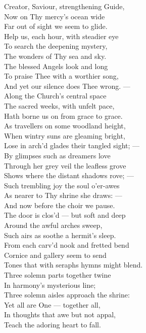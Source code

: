 Creator, Saviour, strengthening Guide, \\
 Now on Thy mercy’s ocean wide \\
 Far out of sight we seem to glide. \\
  Help us, each hour, with steadier eye \\
 To search the deepening mystery, \\
 The wonders of Thy sea and sky. \\
  The blessed Angels look and long \\
 To praise Thee with a worthier song, \\
 And yet our silence does Thee wrong. — \\
  Along the Church’s central space \\
 The sacred weeks, with unfelt pace, \\
 Hath borne us on from grace to grace. \\
  As travellers on some woodland height, \\
 When wintry suns are gleaming bright, \\
 Lose in arch’d glades their tangled sight; — \\
  By glimpses such as dreamers love \\
 Through her grey veil the leafless grove \\
 Shows where the distant shadows rove; — \\
  Such trembling joy the soul o’er-awes \\
 As nearer to Thy shrine she draws: — \\
 And now before the choir we pause. \\
  The door is clos’d — but soft and deep \\
 Around the awful arches sweep, \\
 Such airs as soothe a hermit’s sleep. \\
  From each carv’d nook and fretted bend \\
 Cornice and gallery seem to send \\
 Tones that with seraphs hymns might blend. \\
  Three solemn parts together twine \\
 In harmony’s mysterious line; \\
 Three solemn aisles approach the shrine: \\
  Yet all are One — together all, \\
 In thoughts that awe but not appal, \\
 Teach the adoring heart to fall. \\
